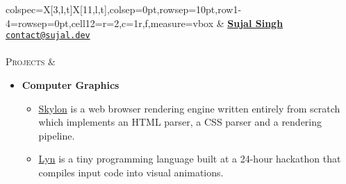 \documentclass[11pt]{article}
\begin{document}
    \noindent%
    \begin{tblr}%
    {colspec={X[3,l,t]X[11,l,t]},colsep=0pt,rowsep=10pt,row{1-4}={rowsep=0pt},cell{1}{2}={r=2,c=1}{r,f},measure=vbox}%
        \href{https://github.com/sujaldev}{\faGithub}
        \hspace{5pt} \href{https://linkedin.com/in/sujal-singh}{\faLinkedin}
        \hspace{5pt} \href{https://youtube.com/@sujaldev}{\faYoutube}
        &
        \href{https://sujal.dev/}{\textbf{\Huge Sujal Singh}}
        \\
        \href{mailto:contact@sujal.dev}{\texttt{contact@sujal.dev}}
        \\ \\
        \textsc{\Large Projects} &
        \vspace*{-1.5\topsep}
        \begin{itemize}[topsep=0pt,leftmargin=15pt]
            \item \textbf{Computer Graphics}
            \begin{itemize}
                \item \href{https://github.com/sujaldev/skylon}{\color{blue}Skylon} is a web browser rendering engine
                written entirely from scratch which implements an HTML parser, a CSS parser and a rendering pipeline.
                \item \href{https://github.com/sujaldev/lyn}{\color{blue}Lyn} is a tiny programming language built at a
                24-hour hackathon that compiles input code into visual animations.
            \end{itemize}



\end{itemize}
\end{tblr}
\end{document}
